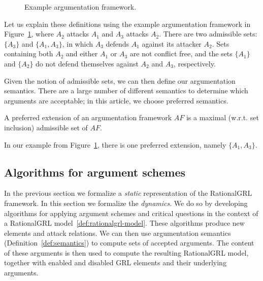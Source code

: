\begin{figure}[ht!]
\centering
{}
\caption{Example argumentation framework.}
\label{fig:goalmodeling:arg2}
\end{figure}

Let us explain these definitions using the example argumentation framework in Figure~\ref{fig:goalmodeling:arg2}, where $A_2$ attacks $A_1$ and $A_3$ attacks $A_2$. There are two admissible sets: $\{A_3\}$ and $\{A_1, A_3\}$, in which $A_3$ defends $A_1$ against its attacker $A_2$. Sets containing both $A_2$ and either $A_1$ or $A_3$ are not conflict free, and the sets $\{A_1\}$ and $\{A_2\}$ do not defend themselves against $A_2$ and $A_3$, respectively. 

Given the notion of admissible sets, we can then define our argumentation semantics. There are a large number of different semantics to determine which arguments are acceptable; in this article, we choose preferred semantics.

\begin{definition} \label{def:semantics}
A preferred extension of an argumentation framework $AF$ is a maximal (w.r.t. set inclusion) admissible set of $AF$.
\end{definition}

In our example from Figure~\ref{fig:goalmodeling:arg2}, there is one preferred extension, namely $\{A_1,A_3\}$.


\subsection{Algorithms for argument schemes}
\label{sect:algorithms}

In the previous section we formalize a \emph{static} representation of the RationalGRL framework. In this section we formalize the \emph{dynamics}. We do so by developing algorithms for applying argument schemes and critical questions in the context of a RationalGRL model~\ref{def:rationalgrl-model}. These algorithms produce new elements and attack relations. We can then use argumentation semantics (Definition~\ref{def:semantics}) to compute sets of accepted arguments. The content of these arguments is then used to compute the resulting RationalGRL model, together with enabled and disabled GRL elements and their underlying arguments.

